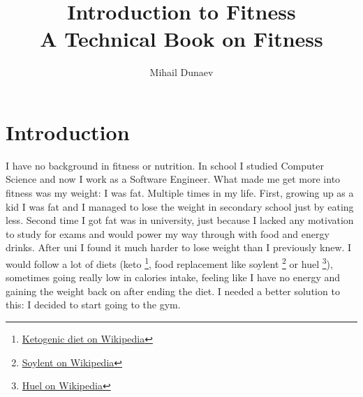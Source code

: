 \documentclass[openany, 12pt]{book}
\title{
  Introduction to Fitness \\
  \vskip 0.5cm
  \small A Technical Book on Fitness}
\author{Mihail Dunaev}
\date{}
\begin{document}
  \maketitle
  \tableofcontents

  \chapter{Introduction}
  
	I have no background in fitness or nutrition. In school I studied Computer Science and now I work as a Software Engineer. What made me get more 
	into fitness was my weight: I was fat. Multiple times in my life. First, growing up as a kid I was fat and I managed to lose the weight in 
	secondary school just by eating less. Second time I got fat was in university, just because I lacked any motivation to study for exams and would
	power my way through with food and energy drinks. After uni I found it much harder to lose weight than I previously knew. I would follow a lot  of diets (keto
        \footnote{\href{https://en.wikipedia.org/wiki/Ketogenic_diet}{Ketogenic diet on Wikipedia}}, food replacement like soylent
        \footnote{\href{https://en.wikipedia.org/wiki/Soylent_(meal_replacement)}{Soylent on Wikipedia}} or huel
        \footnote{\href{https://en.wikipedia.org/wiki/Huel}{Huel on Wikipedia}}), sometimes going really low in calories intake, feeling like I 
	have no energy and gaining the weight back on after ending the diet. I needed a better solution to this: I decided to start going to the gym.
	
\end{document}
